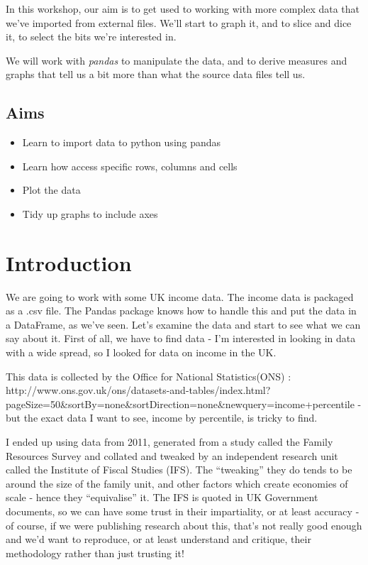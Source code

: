\documentclass[
  letterpaper,
  DIV=11,
  numbers=noendperiod]{scrreprt}
\providecommand{\tightlist}{%
  \setlength{\itemsep}{0pt}\setlength{\parskip}{0pt}}\usepackage{longtable,booktabs,array}
\begin{document}
In this workshop, our aim is to get used to working with more complex
data that we've imported from external files. We'll start to graph it,
and to slice and dice it, to select the bits we're interested in.

We will work with \emph{pandas} to manipulate the data, and to derive
measures and graphs that tell us a bit more than what the source data
files tell us.

\hypertarget{aims}{%
\subsection{Aims}\label{aims}}

\begin{itemize}
\tightlist
\item
  Learn to import data to python using pandas
\item
  Learn how access specific rows, columns and cells
\item
  Plot the data
\item
  Tidy up graphs to include axes
\end{itemize}

\hypertarget{introduction}{%
\section{Introduction}\label{introduction}}

We are going to work with some UK income data. The income data is
packaged as a .csv file. The Pandas package knows how to handle this and
put the data in a DataFrame, as we've seen. Let's examine the data and
start to see what we can say about it. First of all, we have to find
data - I'm interested in looking in data with a wide spread, so I looked
for data on income in the UK.

This data is collected by the Office for National Statistics(ONS) :
http://www.ons.gov.uk/ons/datasets-and-tables/index.html?pageSize=50\&sortBy=none\&sortDirection=none\&newquery=income+percentile
- but the exact data I want to see, income by percentile, is tricky to
find.

I ended up using data from 2011, generated from a study called the
Family Resources Survey and collated and tweaked by an independent
research unit called the Institute of Fiscal Studies (IFS). The
``tweaking'' they do tends to be around the size of the family unit, and
other factors which create economies of scale - hence they
``equivalise'' it. The IFS is quoted in UK Government documents, so we
can have some trust in their impartiality, or at least accuracy - of
course, if we were publishing research about this, that's not really
good enough and we'd want to reproduce, or at least understand and
critique, their methodology rather than just trusting it!
\end{document}
